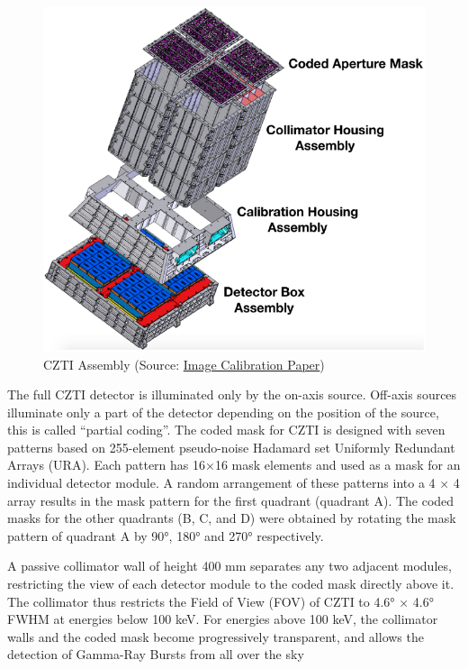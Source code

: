 \documentclass[11pt]{book} %
\begin{document}
\begin{figure}
    \centering
    \includegraphics[scale=0.25]{Pictures/cztiassembly.png}
    \caption{CZTI Assembly (Source: \href{https://arxiv.org/pdf/2108.06746.pdf}{Image Calibration Paper})}
\end{figure}

The full CZTI detector is illuminated
only by the on-axis source. Off-axis sources illuminate
only a part of the detector depending on the position of
the source, this is called “partial coding”. The coded
mask for CZTI is designed with seven patterns based
on 255-element pseudo-noise Hadamard set Uniformly
Redundant Arrays (URA).  Each
pattern has 16×16 mask elements and used as a mask for an individual detector module. A random arrangement of these patterns into a 4 × 4 array results in the mask pattern for the first quadrant (quadrant A). The coded masks for the other quadrants (B, C, and D) were
obtained by rotating the mask pattern of quadrant A by
90°, 180° and 270° respectively.

A passive collimator wall of height 400 mm separates any two adjacent modules, restricting the view
of each detector module to the coded mask directly
above it. The collimator thus restricts the Field of View
(FOV) of CZTI to 4.6° × 4.6° FWHM at energies below
100 keV. For energies above 100 keV, the collimator
walls and the coded mask become progressively transparent, and allows the detection of Gamma-Ray Bursts
from all over the sky
\end{document}

